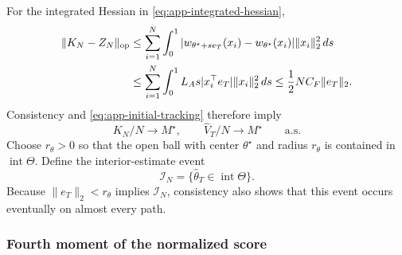 \documentclass[10pt,twoside,letterpaper]{article}
\newcommand{\op}{\mathrm{op}}
\newcommand{\norm}[1]{\lVert #1\rVert}
\newcommand{\Vhat}{\widehat V}
\begin{document}
For the integrated Hessian in \eqref{eq:app-integrated-hessian},
\begin{align}
\norm{K_N-Z_N}_{\op}
&\le\sum_{i=1}^N\int_0^1
 |w_{\theta^\star+s e_T}(x_i)-w_{\theta^\star}(x_i)|
 \norm{x_i}_2^2\,ds\notag\\
&\le\sum_{i=1}^N\int_0^1L_A s|x_i^\top e_T|\norm{x_i}_2^2\,ds
\le\frac12NC_F\norm{e_T}_2.
\label{eq:app-hessian-error}
\end{align}
Consistency and \eqref{eq:app-initial-tracking} therefore imply
\begin{equation}
K_N/N\to M^\star,
\qquad\Vhat_T/N\to M^\star
\qquad\text{a.s.}
\label{eq:app-hessian-stabilization}
\end{equation}
Choose $r_\theta>0$ so that the open ball with center $\theta^\star$
and radius $r_\theta$ is contained in $\operatorname{int}\Theta$.
Define the interior-estimate event
\begin{equation}
\mathcal I_N=\{\widehat\theta_T\in\operatorname{int}\Theta\}.
\label{eq:app-interior-event}
\end{equation}
Because $\norm{e_T}_2<r_\theta$ implies $\mathcal I_N$, consistency
also shows that this event occurs eventually on almost every path.

\subsubsection{Fourth moment of the normalized score}
\end{document}
